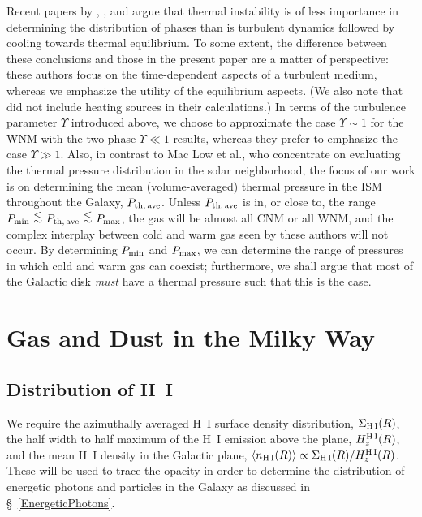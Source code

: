 \documentclass[12pt,preprint,flushrt]{aastex}
\newcommand{\pmax}{P_{\rm max}}
\newcommand{\pmin}{P_{\rm min}}
\newcommand{\pthave}{P_{\rm th,\,ave}}
\newcommand{\al}{\mbox{ \raisebox{-.4ex}{$\stackrel{\textstyle <}{\sim}$} }}
\begin{document}
     Recent papers by  \cite{mac01}, \cite{vaz00}, and \cite{vaz02}
argue that thermal instability is of less importance in 
determining the distribution of phases than is turbulent dynamics followed 
by cooling towards thermal equilibrium. 
To some extent, the difference between these conclusions and
those in the present paper are a matter of perspective:
these authors focus on the time-dependent aspects
of a turbulent medium, whereas we emphasize the
utility of the equilibrium aspects. (We also note that 
\cite{mac01} did not include heating sources in their calculations.)
In terms of the turbulence parameter $\Upsilon$
introduced above, we choose to approximate
the case $\Upsilon\sim 1$ for the WNM with the
two-phase $\Upsilon\ll 1$ results, whereas they
prefer to emphasize the case $\Upsilon\gg 1$. Also,
in contrast to Mac Low et al., who concentrate on
evaluating the thermal pressure distribution in the solar
neighborhood, the focus of our work is on determining
the mean (volume-averaged) thermal pressure in the ISM throughout
the Galaxy, $\pthave$.
Unless $\pthave$ is in, or close to, the range $\pmin\al\pthave\al
\pmax$, the gas will be almost all CNM or all WNM,
and the complex interplay between cold and warm gas
seen by these authors will not occur.  By determining
$\pmin$ and $\pmax$, we can determine the range of
pressures in which cold and warm gas can coexist;
furthermore, we shall argue that most of the Galactic
disk {\it must} have a thermal pressure such that this
is the case.

\section{Gas and Dust in the Milky Way}
\label{sec:gasdust}

\subsection{Distribution of H~I}\label{HIDistribution}
\label{sub:HI}


We require the azimuthally averaged
H~I surface density distribution, $\Sigma_{\rm H\,I}(R)$,
the half width to half maximum of the H~I emission above the plane,
$H_z^{\rm H\,I}(R)$, and the mean H~I density in the Galactic plane,
$\langle n_{\rm H\,I}(R)\rangle \propto
\Sigma_{\rm H\, I}(R)/H_z^{\rm H\, I}(R)$.
These will be used to trace the opacity in order to
determine the distribution of energetic
photons and particles in the Galaxy as discussed in
\S~\ref{EnergeticPhotons}.
\end{document}
